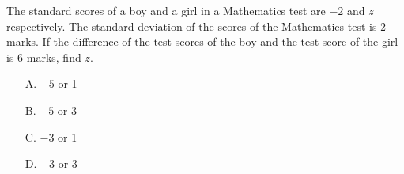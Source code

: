 The standard scores of a boy and a girl in a Mathematics test are $-2$ and $z$ respectively. The standard deviation of the scores of the Mathematics test is 2 marks. If the difference of the test scores of the boy and the test score of the girl is 6 marks, find $z$.
    \begin{itemize}
        \item[A.] $-5$ or 1
        \item[B.] $-5$ or 3
        \item[C.] $-3$ or 1
        \item[D.] $-3$ or 3
    \end{itemize}



